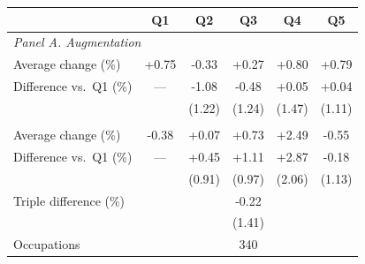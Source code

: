 \begin{tabular}{lccccc}
\toprule
 & Q1 & Q2 & Q3 & Q4 & Q5 \\
\midrule
\multicolumn{6}{l}{\textit{Panel A. Augmentation}} \\
\quad Average change (\%) & +0.75 & -0.33 & +0.27 & +0.80 & +0.79 \\
\quad Difference vs.\ Q1 (\%) & --- & -1.08 & -0.48 & +0.05 & +0.04 \\
 &  & (1.22) & (1.24) & (1.47) & (1.11) \\
\addlinespace
\multicolumn{6}{l}{\textit{Panel B. Automation}} \\
\quad Average change (\%) & -0.38 & +0.07 & +0.73 & +2.49 & -0.55 \\
\quad Difference vs.\ Q1 (\%) & --- & +0.45 & +1.11 & +2.87 & -0.18 \\
 &  & (0.91) & (0.97) & (2.06) & (1.13) \\
\midrule
Triple difference (\%) & \multicolumn{5}{c}{-0.22} \\
 & \multicolumn{5}{c}{(1.41)} \\
Occupations & \multicolumn{5}{c}{340} \\
\bottomrule
\end{tabular}
